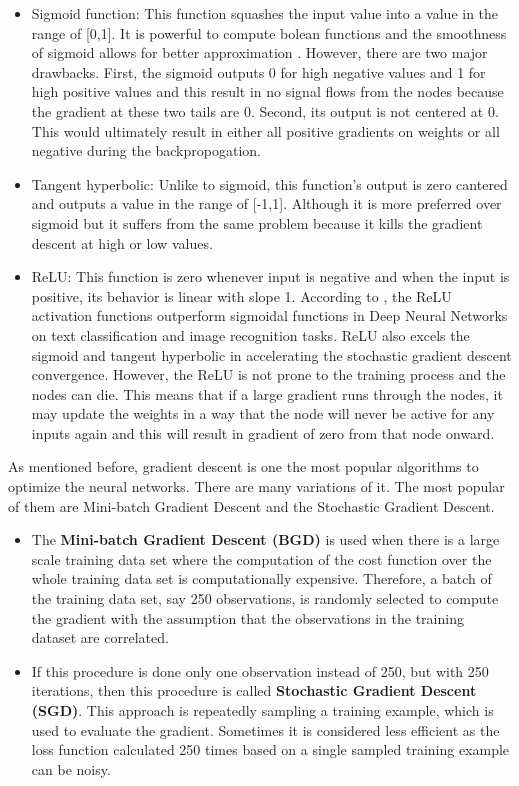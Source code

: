 \begin{itemize}
    \item Sigmoid function: This function squashes the input value into a value in the range of [0,1]. It is powerful to compute bolean functions and the smoothness of sigmoid allows for better approximation \cite{dasgupta1993power}. However, there are two major drawbacks. First, the sigmoid outputs 0 for high negative values and 1 for high positive values and this result in no signal flows from the nodes because the gradient at these two tails are 0. Second, its output is not centered at 0. This would ultimately result in either all positive gradients on weights or all negative during the backpropogation.
    \item Tangent hyperbolic: Unlike to sigmoid, this function’s output is zero cantered and outputs a value in the range of [-1,1]. Although it is more preferred over sigmoid but it suffers from the same problem because it kills the gradient descent at high or low values.
    \item ReLU: This function is zero whenever input is negative and when the input is positive, its behavior is linear with slope 1. According to \cite{glorot2011domain}, the ReLU activation functions outperform sigmoidal functions in Deep Neural Networks on text classification and image recognition tasks. ReLU also excels the sigmoid and tangent hyperbolic in accelerating the stochastic gradient descent convergence. However, the ReLU is not prone to the training process and the nodes can die. This means that if a large gradient runs through the nodes, it may update the weights in a way that the node will never be active for any inputs again and this will result in gradient of zero from that node onward.
\end{itemize}

As mentioned before, gradient descent is one the most popular algorithms to optimize the neural networks. There are many variations of it. The most popular of them are Mini-batch Gradient Descent and the Stochastic Gradient Descent. 

\begin{itemize}
    \item The \textbf{Mini-batch Gradient Descent (BGD)} is used when there is a large scale training data set where the computation of the cost function over the whole training data set is computationally expensive. Therefore, a batch of the training data set, say 250 observations, is randomly selected to compute the gradient with the assumption that the observations in the training dataset are correlated. 
    \item If this procedure is done only one observation instead of 250, but with 250 iterations, then this procedure is called \textbf{Stochastic Gradient Descent (SGD)}. This approach is repeatedly sampling a training example, which is used to evaluate the gradient. Sometimes it is considered less efficient as the loss function calculated 250 times based on a single sampled training example can be noisy.
\end{itemize}

